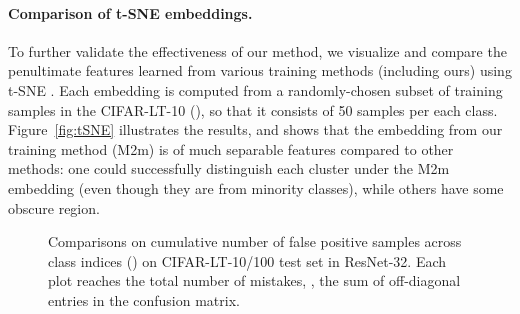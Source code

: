 \begin{figure*}[t]
\begin{center}
    {
    }
\end{center}
\vspace{-0.12in}
\caption{Visualization of the penultimate features via t-SNE computed from a balanced subset of CIFAR-LT-10 with ResNet-32.}
\label{fig:tSNE}
\vspace{-0.12in}
\end{figure*}

\vspace{-0.15in}
\paragraph{Comparison of t-SNE embeddings.} 
To further validate the effectiveness of our method, we visualize and compare the penultimate features learned from various training methods (including ours) using t-SNE \citep{maaten2008visualizing}. Each embedding is computed from a randomly-chosen subset of training samples in the CIFAR-LT-10 (), so that it consists of 50 samples per each class.
Figure~\ref{fig:tSNE} illustrates the results, and shows that the embedding from our training method (M2m) is of much separable features compared to other methods:
one could successfully distinguish each cluster under the M2m embedding (even though they are from minority classes), while others have some obscure region.

\begin{figure}[t]
\begin{center}
    \end{center}
    \vspace{-0.05in}
    \caption{Comparisons on cumulative number of false positive samples across class indices () on CIFAR-LT-10/100 test set in ResNet-32. Each plot reaches the total number of mistakes, \ie, the sum of off-diagonal entries in the confusion matrix.}
    \label{fig:cumul}
    \vspace{-0.15in}
\end{figure}

